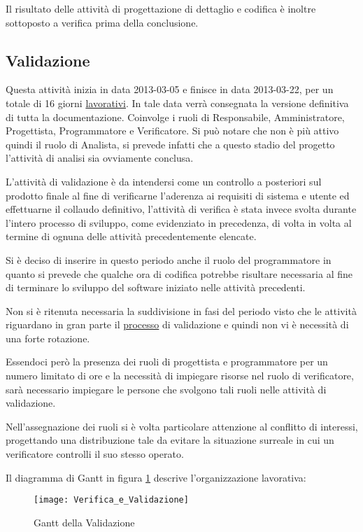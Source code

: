 Il risultato delle attività di progettazione di dettaglio e codifica è inoltre sottoposto a verifica prima della conclusione.

\clearpage

\subsection{Validazione}

Questa attività inizia in data 2013-03-05 e finisce in data 2013-03-22, per un totale di 16 giorni \underline{lavorativi}. In tale data verrà consegnata la versione definitiva di tutta la documentazione. Coinvolge i ruoli di Responsabile, Amministratore, Progettista, Programmatore e Verificatore. Si può notare che non è più attivo quindi il ruolo di Analista, si prevede infatti che a questo stadio del progetto l'attività di analisi sia ovviamente conclusa.

L'attività di validazione è da intendersi come un controllo a posteriori sul prodotto finale al fine di verificarne l'aderenza ai requisiti di sistema e utente ed effettuarne il collaudo definitivo, l'attività di verifica è stata invece svolta durante l'intero processo di sviluppo, come evidenziato in precedenza, di volta in volta al termine di ognuna delle attività precedentemente elencate.

Si è deciso di inserire  in questo periodo anche il ruolo del programmatore in quanto si prevede che qualche ora di codifica potrebbe risultare necessaria al fine di terminare lo sviluppo del software iniziato nelle attività precedenti.

Non si è ritenuta necessaria la suddivisione in fasi del periodo visto che le attività riguardano in gran parte il \underline{processo} di validazione e quindi non vi è necessità di una forte rotazione.

Essendoci però la presenza dei ruoli di progettista e programmatore per un numero limitato di ore e la necessità di impiegare risorse nel ruolo di verificatore, sarà necessario impiegare le persone che svolgono tali ruoli nelle attività di validazione.  

Nell'assegnazione dei ruoli si è volta particolare attenzione al conflitto di interessi,  progettando una distribuzione tale da evitare la situazione surreale in cui un verificatore controlli il suo stesso operato.

Il diagramma di Gantt in figura \ref{fig:gantvv} descrive l'organizzazione lavorativa:

\begin{figure}[h!]
  \texttt{[image: Verifica\_e\_Validazione]}
\caption{Gantt della Validazione}\label{fig:gantvv}
\end{figure}

